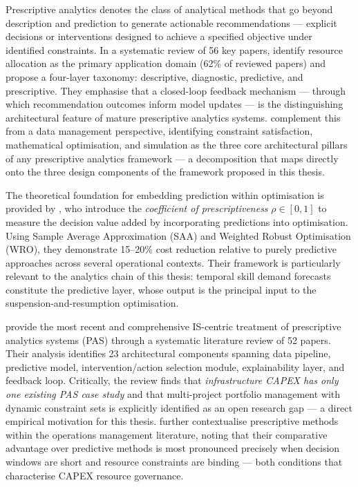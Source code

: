 Prescriptive analytics denotes the class of analytical methods that go beyond description
and prediction to generate actionable recommendations — explicit decisions or interventions
designed to achieve a specified objective under identified constraints. In a systematic
review of 56 key papers, \textcite{lepenioti2020prescriptive} identify resource allocation as
the primary application domain (62\% of reviewed papers) and propose a four-layer taxonomy:
descriptive, diagnostic, predictive, and prescriptive. They emphasise that a closed-loop
feedback mechanism — through which recommendation outcomes inform model updates — is the
distinguishing architectural feature of mature prescriptive analytics systems.
\textcite{frazzetto2019prescriptive} complement this from a data management perspective,
identifying constraint satisfaction, mathematical optimisation, and simulation as the three
core architectural pillars of any prescriptive analytics framework — a decomposition that
maps directly onto the three design components of the framework proposed in this thesis.

The theoretical foundation for embedding prediction within optimisation is provided by
\textcite{bertsimas2020predictive}, who introduce the \textit{coefficient of prescriptiveness}
$\rho \in [0,1]$ to measure the decision value added by incorporating predictions into
optimisation. Using Sample Average Approximation (SAA) and Weighted Robust Optimisation
(WRO), they demonstrate 15--20\% cost reduction relative to purely predictive approaches
across several operational contexts. Their framework is particularly relevant to the
analytics chain of this thesis: temporal skill demand forecasts constitute the predictive
layer, whose output is the principal input to the suspension-and-resumption optimisation.

\textcite{wissuchek2025prescriptive} provide the most recent and comprehensive IS-centric
treatment of prescriptive analytics systems (PAS) through a systematic literature review
of 52 papers. Their analysis identifies 23 architectural components spanning data pipeline,
predictive model, intervention/action selection module, explainability layer, and feedback
loop. Critically, the review finds that \textit{infrastructure CAPEX has only one existing
PAS case study} and that multi-project portfolio management with dynamic constraint sets is
explicitly identified as an open research gap — a direct empirical motivation for this thesis.
\textcite{misic2020analytics} further contextualise prescriptive methods within the operations
management literature, noting that their comparative advantage over predictive methods is
most pronounced precisely when decision windows are short and resource constraints are binding
— both conditions that characterise CAPEX resource governance.

